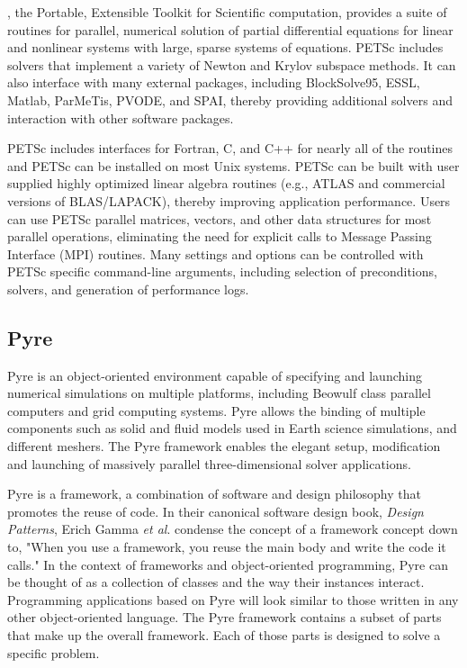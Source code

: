 , the
Portable, Extensible Toolkit for Scientific computation, provides a
suite of routines for parallel, numerical solution of partial
differential equations for linear and nonlinear systems with large,
sparse systems of equations. PETSc includes solvers that implement a
variety of Newton and Krylov subspace methods. It can also interface
with many external packages, including BlockSolve95, ESSL, Matlab,
ParMeTis, PVODE, and SPAI, thereby providing additional solvers and
interaction with other software packages.

PETSc includes interfaces for Fortran, C, and C++ for nearly all of
the routines and PETSc can be installed on most Unix systems. PETSc
can be built with user supplied highly optimized linear algebra
routines (e.g., ATLAS and commercial versions of BLAS/LAPACK), thereby
improving application performance. Users can use PETSc parallel
matrices, vectors, and other data structures for most parallel
operations, eliminating the need for explicit calls to Message Passing
Interface (MPI) routines. Many settings and options can be controlled
with PETSc specific command-line arguments, including selection of
preconditions, solvers, and generation of performance logs.

\subsection{Pyre}

Pyre is an object-oriented environment capable of specifying and
launching numerical simulations on multiple platforms, including
Beowulf class parallel computers and grid computing systems. Pyre
allows the binding of multiple components such as solid and fluid
models used in Earth science simulations, and different meshers. The
Pyre framework enables the elegant setup, modification and launching
of massively parallel three-dimensional solver applications.

Pyre is a framework, a combination of software and design philosophy
that promotes the reuse of code. In their canonical software design
book, {\em Design Patterns}, Erich Gamma {\it et al}.  condense the
concept of a framework concept down to, "When you use a framework, you
reuse the main body and write the code it calls." In the context of
frameworks and object-oriented programming, Pyre can be thought of as
a collection of classes and the way their instances interact.
Programming applications based on Pyre will look similar to those
written in any other object-oriented language. The Pyre framework
contains a subset of parts that make up the overall framework. Each of
those parts is designed to solve a specific problem.

